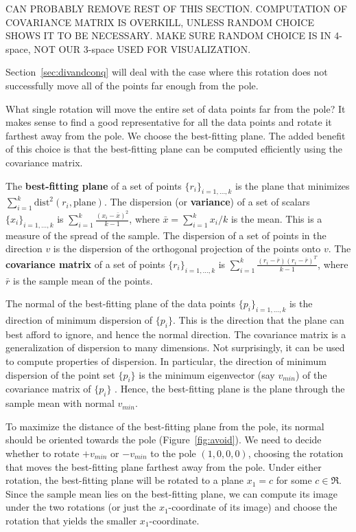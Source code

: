 CAN PROBABLY REMOVE REST OF THIS SECTION.
COMPUTATION OF COVARIANCE MATRIX IS OVERKILL, UNLESS RANDOM
CHOICE SHOWS IT TO BE NECESSARY.
MAKE SURE RANDOM CHOICE IS IN 4-space, NOT OUR 3-space USED
FOR VISUALIZATION.

Section~\ref{sec:divandconq} will deal with the case where
this rotation does not successfully move all of the points far enough
from the pole.

What single rotation will move the entire set of data points far from the pole?
It makes sense to find a good representative for all the data
points and rotate it farthest away from the pole.
We choose the best-fitting plane.
The added benefit of this choice is that the best-fitting plane
can be computed efficiently using the covariance matrix.

\begin{defn2}
The {\bf best-fitting plane} of a set of points $\{r_i\}_{i=1,\ldots,k}$
is the plane that minimizes $\sum_{i=1}^k \mbox{dist}^2 (r_i,\mbox{plane})$.
The dispersion (or {\bf variance}) of a set of scalars
$\{x_i\}_{i=1,\ldots,k}$ is $\sum_{i=1}^k \frac{(x_i -
\bar{x})^2}{k-1}$, where $\bar{x} = \sum_{i=1}^k x_i / k$ is the mean.
This is a measure of the spread of the sample.
The dispersion of a set of points in the direction $v$ is the dispersion
of the orthogonal projection of the points onto $v$.
The {\bf covariance matrix} of a set of points $\{r_i\}_{i=1,\ldots,k}$ 
is $\sum_{i=1}^k \frac{(r_i - \bar{r})(r_i - \bar{r})^T}{k-1}$,
where $\bar{r}$ is the sample mean of the points.
\end{defn2}

The normal of the best-fitting plane of the data points $\{p_i\}_{i=1,\ldots,k}$
is the direction of minimum dispersion of $\{p_i\}$.
This is the direction that the plane can best afford to ignore,
and hence the normal direction.
The covariance matrix is a generalization of dispersion to many dimensions.
Not surprisingly, it can be used to compute properties of dispersion.
In particular, the direction of minimum dispersion of 
the point set $\{p_i\}$ is the minimum 
eigenvector (say $v_{min}$) of the covariance matrix of $\{p_i\}$ \cite{ballard82}.
Hence, the best-fitting plane is the plane through the sample mean
with normal $v_{min}$.

To maximize the distance of the best-fitting plane from the pole,
its normal should be oriented towards the pole (Figure~\ref{fig:avoid}).
We need to decide whether to rotate $+v_{min}$ or $-v_{min}$ to the pole
$(1,0,0,0)$, choosing the rotation that moves the best-fitting plane
farthest away from the pole.
Under either rotation, the best-fitting plane 
will be rotated to a plane $x_1 = c$ for some $c \in \Re$.
Since the sample mean lies on the best-fitting plane,
we can compute its image under the two rotations
(or just the $x_1$-coordinate of its image) 
and choose the rotation that yields the smaller $x_1$-coordinate.


